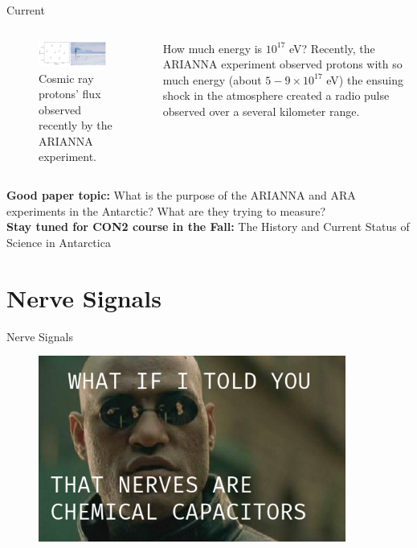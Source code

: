 \documentclass{beamer}
\begin{document}
\begin{frame}{Current}
\begin{columns}[T]
\begin{column}{0.5\textwidth}
\begin{figure}
\centering
\includegraphics[width=0.9\textwidth]{figures/ARIANNA3.png}
\caption{\label{fig:ARIANNA3} Cosmic ray protons' flux observed recently by the ARIANNA experiment.}
\end{figure}
\end{column}
\begin{column}{0.5\textwidth}
\small
How much energy is $10^{17}$ eV?  Recently, the ARIANNA experiment observed protons with so much energy (about $5-9 \times 10^{17}$ eV) the ensuing shock in the atmosphere created a radio pulse observed over a several kilometer range.
\end{column}
\end{columns}
\textbf{Good paper topic:} What is the purpose of the ARIANNA and ARA experiments in the Antarctic?  What are they trying to measure? \\
\textbf{Stay tuned for CON2 course in the Fall:} The History and Current Status of Science in Antarctica
\end{frame}

\section{Nerve Signals}

\begin{frame}{Nerve Signals}
\begin{figure}
\centering
\includegraphics[width=0.9\textwidth]{figures/Matrix-Morpheus.png}
\end{figure}
\end{frame}
\end{document}
